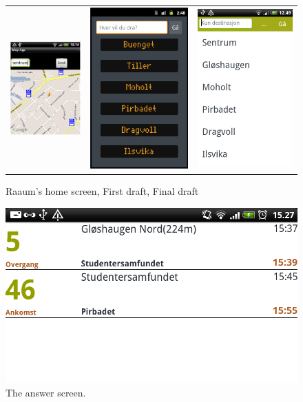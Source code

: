 \begin{figure}
\begin{tabular}{ccc}
\includegraphics[width=0.33\linewidth]{DesigningGUI/magnus1.png} & 
\includegraphics[width=0.33\linewidth]{DesigningGUI/earlydraft.png}&
\includegraphics[width=0.33\linewidth]{DesigningGUI/finaldraft.png}
\end{tabular}
\caption{Raaum's home screen, First draft, Final draft}
\end{figure}
\begin{figure}
\includegraphics[width=1\linewidth]{DesigningGUI/suggestion.png}
\caption{The answer screen.}
\end{figure}
